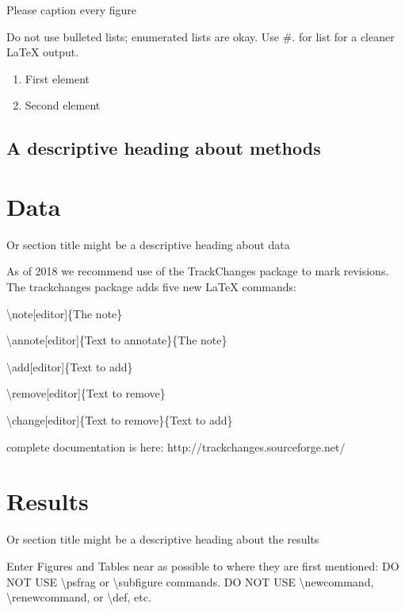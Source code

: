 \documentclass[draft,linenumbers]{agujournal2018}
\begin{document}
\hypertarget{htmlwidget-3c87f60362e56efce783}{}

Please caption every figure

Do not use bulleted lists; enumerated lists are okay. Use \#. for list
for a cleaner LaTeX output.

\begin{enumerate}
\item
  First element
\item
  Second element
\end{enumerate}

\subsection{A descriptive heading about methods}

\section{Data}

Or section title might be a descriptive heading about data

As of 2018 we recommend use of the TrackChanges package to mark
revisions. The trackchanges package adds five new LaTeX commands:

\textbackslash{}note{[}editor{]}\{The note\}

\textbackslash{}annote{[}editor{]}\{Text to annotate\}\{The note\}

\textbackslash{}add{[}editor{]}\{Text to add\}

\textbackslash{}remove{[}editor{]}\{Text to remove\}

\textbackslash{}change{[}editor{]}\{Text to remove\}\{Text to add\}

complete documentation is here: http://trackchanges.sourceforge.net/

\section{Results}

Or section title might be a descriptive heading about the results

Enter Figures and Tables near as possible to where they are first
mentioned: DO NOT USE \textbackslash{}psfrag or
\textbackslash{}subfigure commands. DO NOT USE
\textbackslash{}newcommand, \textbackslash{}renewcommand, or
\textbackslash{}def, etc.
\end{document}
